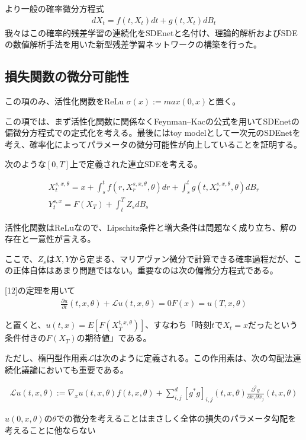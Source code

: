 \documentclass{jsarticle}
\begin{document}
より一般の確率微分方程式
\begin{align}
dX_t=f(t,X_t)dt+g(t,X_t)dB_t
\end{align}
我々はこの確率的残差学習の連続化をSDEnetと名付け、理論的解析およびSDEの数値解析手法を用いた新型残差学習ネットワークの構築を行った。


\subsection{損失関数の微分可能性}
この項のみ、活性化関数をReLu $\sigma(x):=max(0,x)$と置く。

この項では、まず活性化関数に関係なくFeynman–Kacの公式を用いてSDEnetの偏微分方程式での定式化を考える。最後にはtoy modelとして一次元のSDEnetを考え、確率化によってパラメータの微分可能性が向上していることを証明する。

次のような$[0,T]$上で定義された連立SDEを考える。

\begin{align}
X^{s,x,\theta}_t=x+\int^t_sf(r,X^{s,x,\theta}_r,\theta)dr+\int^t_sg(t,X^{s,x,\theta}_r,\theta)dB_r\\
Y^{s,x}_t=F(X_T)+\int^T_t Z_s dB_s
\end{align}

活性化関数はReLuなので、Lipschitz条件と増大条件は問題なく成り立ち、解の存在と一意性が言える。

ここで、$Z_s$は$X,Y$から定まる、マリアヴァン微分で計算できる確率過程だが、この正体自体はあまり問題ではない。重要なのは次の偏微分方程式である。

[12]の定理を用いて
\begin{align}
\frac{\partial u}{\partial t}(t,x,\theta)+\mathcal{L}u(t,x,\theta)=0
F(x)=u(T,x,\theta)
\end{align}


と置くと、$u(t,x)=E[F(X^{t,x,\theta}_T)]$、すなわち「時刻$t$で$X_t=x$だったという条件付きの$F(X_T)$の期待値」である。

ただし、楕円型作用素$\mathcal{L}$は次のように定義される。この作用素は、次の勾配法連続化議論においても重要である。

\begin{align}
\mathcal{L}u(t,x,\theta):=\nabla_x u(t,x,\theta) f(t,x,\theta)+\sum^d_{i,j} [g^*g]_{i,j}(t,x,\theta)\frac{\partial^2 g}{\partial x_i\partial x_j}(t,x,\theta)
\end{align}


$u(0,x,\theta)$の$\theta$での微分を考えることはまさしく全体の損失のパラメータ勾配を考えることに他ならない
\end{document}
